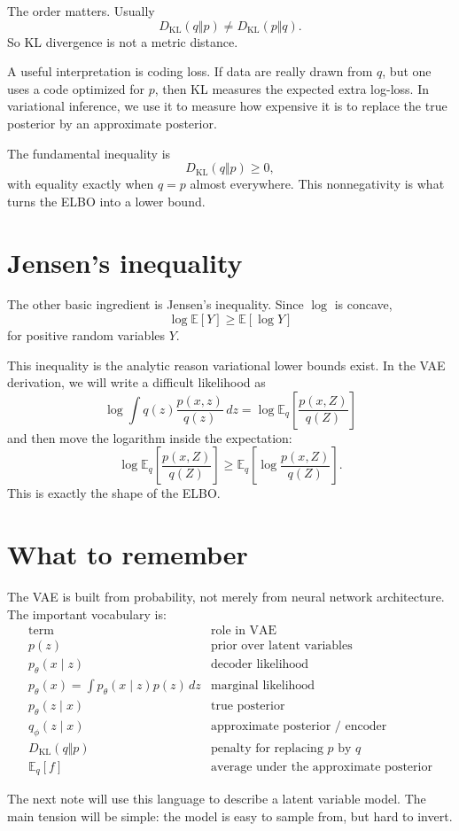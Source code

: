 The order matters.  Usually
\[
  D_{\mathrm{KL}}(q\Vert p)\ne D_{\mathrm{KL}}(p\Vert q).
\]
So KL divergence is not a metric distance.

A useful interpretation is coding loss.  If data are really drawn from \(q\), but one uses a code optimized for \(p\), then KL measures the expected extra log-loss.  In variational inference, we use it to measure how expensive it is to replace the true posterior by an approximate posterior.

The fundamental inequality is
\[
  D_{\mathrm{KL}}(q\Vert p)\ge0,
\]
with equality exactly when \(q=p\) almost everywhere.  This nonnegativity is what turns the ELBO into a lower bound.

\section{Jensen's inequality}

The other basic ingredient is Jensen's inequality.  Since \(\log\) is concave,
\[
  \log \mathbb E[Y]\ge \mathbb E[\log Y]
\]
for positive random variables \(Y\).

This inequality is the analytic reason variational lower bounds exist.  In the VAE derivation, we will write a difficult likelihood as
\[
  \log \int q(z)\frac{p(x,z)}{q(z)}\,dz
  =\log \mathbb E_q\left[\frac{p(x,Z)}{q(Z)}\right]
\]
and then move the logarithm inside the expectation:
\[
  \log \mathbb E_q\left[\frac{p(x,Z)}{q(Z)}\right]
  \ge
  \mathbb E_q\left[\log\frac{p(x,Z)}{q(Z)}\right].
\]
This is exactly the shape of the ELBO.

\section{What to remember}

The VAE is built from probability, not merely from neural network architecture.  The important vocabulary is:
\[
\begin{array}{c|c}
\text{term} & \text{role in VAE}\\
\hline
p(z) & \text{prior over latent variables}\\
p_\theta(x\mid z) & \text{decoder likelihood}\\
p_\theta(x)=\int p_\theta(x\mid z)p(z)\,dz & \text{marginal likelihood}\\
p_\theta(z\mid x) & \text{true posterior}\\
q_\phi(z\mid x) & \text{approximate posterior / encoder}\\
D_{\mathrm{KL}}(q\Vert p) & \text{penalty for replacing }p\text{ by }q\\
\mathbb E_q[f] & \text{average under the approximate posterior}
\end{array}
\]

The next note will use this language to describe a latent variable model.  The main tension will be simple: the model is easy to sample from, but hard to invert.
